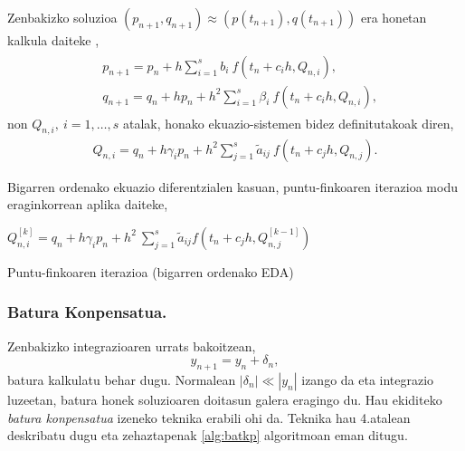 Zenbakizko soluzioa $(p_{n+1},q_{n+1}) \approx (p(t_{n+1}),q(t_{n+1}))$ era honetan kalkula daiteke \cite{JMSanz-Serna1994},
\begin{align}
\begin{split}
&p_{n+1}=p_n+ h \sum\limits_{i=1}^{s} b_i \ f(t_n+c_ih,Q_{n,i}),\\
&q_{n+1}=q_n+ h p_{n} + h^2 \sum\limits_{i=1}^{s} \beta_i \ f(t_n+c_ih,Q_{n,i}),
\end{split}
\end{align}
%
non $Q_{n,i}, \ i=1,\dots,s$ atalak, honako ekuazio-sistemen bidez definitutakoak diren, 
\begin{align}
Q_{n,i}=q_n+ h\gamma_i p_n+ h^2 \sum\limits_{j=1}^{s} \tilde{a}_{ij} \ f(t_n+c_jh,Q_{n,j}).
\end{align}

Bigarren ordenako ekuazio diferentzialen kasuan, puntu-finkoaren iterazioa modu eraginkorrean aplika daiteke,

\begin{algorithm}[H]
  {
   $Q_{n,i}^{[k]}=q_{n}+h \gamma_i p_{n}+ h^2 \ \sum\limits_{j=1}^{s} \tilde{a}_{ij} f(t_n+c_jh,Q_{n,j}^{[k-1]}) $\;  
  }
 \caption{Puntu-finkoaren iterazioa (bigarren ordenako EDA)}
\end{algorithm} 

%


\subsubsection*{Batura Konpensatua.}

Zenbakizko integrazioaren urrats bakoitzean,
\begin{equation*}
y_{n+1}=y_{n}+ \delta_n,
\end{equation*}
batura kalkulatu behar dugu. Normalean $|\delta_n| \ll |y_n| $ izango da eta integrazio luzeetan, batura honek soluzioaren doitasun galera eragingo du. Hau ekiditeko \emph{batura konpensatua} izeneko  teknika \cite{Muller2009,Higham2002,Hairer2006} erabili ohi da. Teknika hau 4.atalean deskribatu dugu eta zehaztapenak \ref{alg:batkp} algoritmoan eman ditugu.
 

